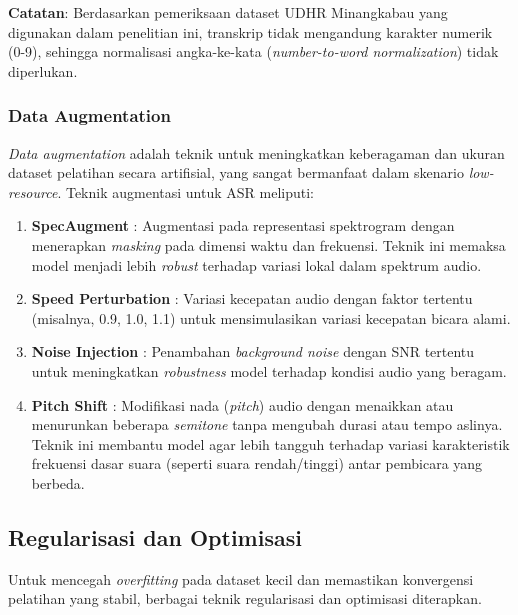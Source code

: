 \noindent
\textbf{Catatan}: Berdasarkan pemeriksaan dataset UDHR Minangkabau yang digunakan dalam penelitian ini, transkrip tidak mengandung karakter numerik (0-9), sehingga normalisasi angka-ke-kata (\textit{number-to-word normalization}) tidak diperlukan.

\subsubsection{Data Augmentation}

\textit{Data augmentation} adalah teknik untuk meningkatkan keberagaman dan ukuran dataset pelatihan secara artifisial, yang sangat bermanfaat dalam skenario \textit{low-resource}. Teknik augmentasi untuk ASR meliputi:

\begin{enumerate}[noitemsep]
    \item \textbf{SpecAugment} \cite{park2019specaugment}: Augmentasi pada representasi spektrogram dengan menerapkan \textit{masking} pada dimensi waktu dan frekuensi. Teknik ini memaksa model menjadi lebih \textit{robust} terhadap variasi lokal dalam spektrum audio.
    
    \item \textbf{Speed Perturbation} \cite{ko2015audio}: Variasi kecepatan audio dengan faktor tertentu (misalnya, 0.9, 1.0, 1.1) untuk mensimulasikan variasi kecepatan bicara alami.
    
    \item \textbf{Noise Injection} \cite{kim2020augmentation}: Penambahan \textit{background noise} dengan SNR tertentu untuk meningkatkan \textit{robustness} model terhadap kondisi audio yang beragam.
    
    \item \textbf{Pitch Shift} \cite{kim2020augmentation}: Modifikasi nada (\textit{pitch}) audio dengan menaikkan atau menurunkan beberapa \textit{semitone} tanpa mengubah durasi atau tempo aslinya. Teknik ini membantu model agar lebih tangguh terhadap variasi karakteristik frekuensi dasar suara (seperti suara rendah/tinggi) antar pembicara yang berbeda.
\end{enumerate}

\subsection{Regularisasi dan Optimisasi}
\label{II.Regularization}

Untuk mencegah \textit{overfitting} pada dataset kecil dan memastikan konvergensi pelatihan yang stabil, berbagai teknik regularisasi dan optimisasi diterapkan.

